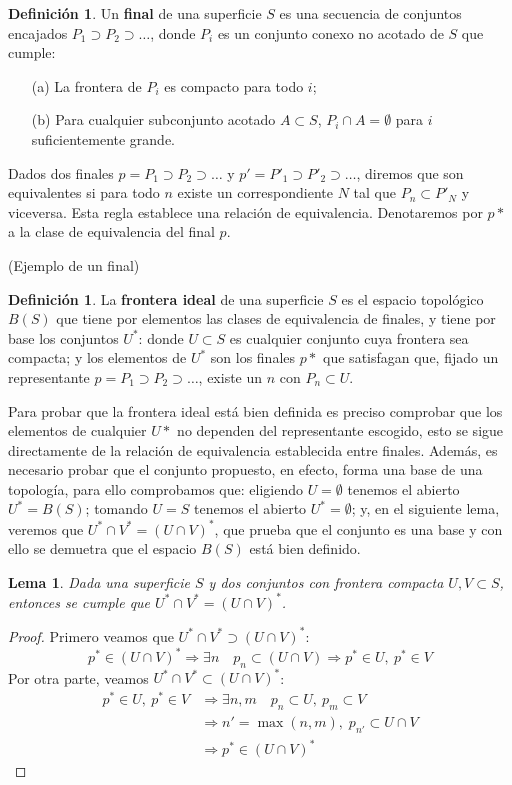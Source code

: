 \documentclass[a4paper,11pt,spanish, twoside, leqno]{tfg-uam}
\newtheorem{lema}[teor]{Lema}
\theoremstyle{definition}
\newtheorem{defin}[teor]{Definici\'on}
\begin{document}
\begin{defin}
Un \textbf{final} de una superficie $S$ es una secuencia de conjuntos encajados $P_1 \supset P_2 \supset \ldots$, donde $P_i$ es un conjunto conexo no acotado de $S$ que cumple:
\begin{enumerate}
\item[(a)] La frontera de $P_i$ es compacto para todo $i$;
\item[(b)] Para cualquier subconjunto acotado $A \subset S$, $P_i \cap A = \emptyset$ para $i$ suficientemente grande.
\end{enumerate}
\end{defin}
Dados dos finales $p = P_1 \supset P_2 \supset \ldots$  y  $p' = P'_1 \supset P'_2 \supset \ldots$, diremos que son equivalentes si para todo $n$ existe un correspondiente $N$ tal que $P_n \subset P'_N$ y viceversa.  Esta regla establece una relación de equivalencia. Denotaremos por $p*$ a la clase de equivalencia del final $p$.

(Ejemplo de un final)

\begin{defin}
La \textbf{frontera ideal} de una superficie $S$ es el espacio topológico $B(S)$ que tiene por elementos las clases de equivalencia de finales, y tiene por base los conjuntos $U^*$: donde $U\subset S$ es cualquier conjunto  cuya frontera sea compacta; y los elementos de $U^*$ son los finales $p*$ que satisfagan que, fijado un representante $p=P_1 \supset P_2 \supset \ldots $, existe un $n$ con $P_n \subset U$.
\end{defin}
Para probar que la frontera ideal está bien definida es preciso comprobar que los elementos de cualquier $U*$ no dependen del representante escogido, esto se sigue directamente de la relación de equivalencia establecida entre finales. Además, es necesario probar que el conjunto propuesto, en efecto, forma una base de una topología, para ello comprobamos que: eligiendo $U=\emptyset$ tenemos el abierto $U^*=B(S)$; tomando $U = S$ tenemos el abierto $U^*=\emptyset$; y, en el siguiente lema, veremos que $U^* \cap V^* = (U \cap V)^*$, que prueba que el conjunto es una base y con ello se demuetra que el espacio $B(S)$ está bien definido.

\begin{lema}
Dada una superficie $S$ y dos conjuntos  con frontera compacta $U,V \subset S$, entonces se cumple que $U^*\cap V^* = (U \cap V)^* $.
\end{lema}
\begin{proof}
Primero veamos que $U^*\cap V^* \supset (U \cap V)^* $:
\[
p^* \in (U \cap V)^* \Rightarrow
\exists n \quad p_n \subset (U \cap V) \Rightarrow
p^* \in U, \: p^* \in V
\]
Por otra parte, veamos $U^*\cap V^* \subset (U \cap V)^* $:
\begin{align*}
p^* \in U, \: p^* \in V & \Rightarrow \exists n,m \quad p_n \subset U, \: p_m \subset V\\
& \Rightarrow n' = \max(n,m), \; p_{n'} \subset U \cap V\\
& \Rightarrow p^* \in (U\cap V)^*
\end{align*}
\end{proof}
\end{document}
